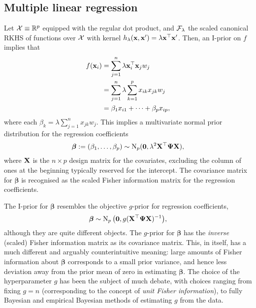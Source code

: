 \subsection{Multiple linear regression}

Let ${\mathcal X}\equiv \mathbb{R}^p$ equipped with the regular dot product, and ${\mathcal F}_\lambda$ the scaled canonical RKHS of functions over ${\mathcal X}$ with kernel $h_\lambda({\mathbf x},{\mathbf x}') = \lambda {\mathbf x}^\top{\mathbf x}'$. 
Then, an I-prior on $f$ implies that 
\begin{align*}
  f({\mathbf x}_i) &= \sum_{j=1}^n \lambda {\mathbf x}_i^\top{\mathbf x}_j w_j \\
  &= \sum_{j=1}^n \lambda \sum_{k=1}^p x_{ik}x_{jk} w_j \\
  &= \beta_1 x_{i1}+ \dots + \beta_p x_{ip},
\end{align*}
where each $\beta_k = \lambda \sum_{j=1}^n  x_{jk}w_j$.
This implies a multivariate normal prior distribution for the regression coefficients   
\begin{align*}
  \boldsymbol\beta := (\beta_1,\dots,\beta_p) \sim \operatorname{N}_p({\mathbf 0}, \lambda^2 {\mathbf X}^\top {\bm\Psi} {\mathbf X}),
\end{align*}
where ${\mathbf X}$ is the $n \times p$ design matrix for the covariates, excluding the column of ones at the beginning typically reserved for the intercept. 
The covariance matrix for $\boldsymbol\beta$ is recognised as the scaled Fisher information matrix for the regression coefficients.

The I-prior for $\boldsymbol{\beta}$ resembles the objective $g$-prior \citep{zellner1986assessing} for regression coefficients,
\[
  \boldsymbol{\beta} \sim \operatorname{N}_p\big({\mathbf 0}, g ({\mathbf X}^\top {\bm\Psi} {\mathbf X})^{-1} \big),
\]
although they are quite different objects. 
The $g$-prior for $\boldsymbol{\beta}$ has the \emph{inverse} (scaled) Fisher information matrix as its covariance matrix.
This, in itself, has a much different and arguably counterintuitive meaning: large amounts of Fisher information about $\boldsymbol{\beta}$ corresponds to a small prior variance, and hence less deviation away from the prior mean of zero in estimating $\boldsymbol\beta$.
The choice of the hyperparameter $g$ has been the subject of much debate, with choices ranging from fixing $g=n$ (corresponding to the concept of \emph{unit Fisher information}), to fully Bayesian and empirical Bayesian methods of estimating $g$ from the data.

